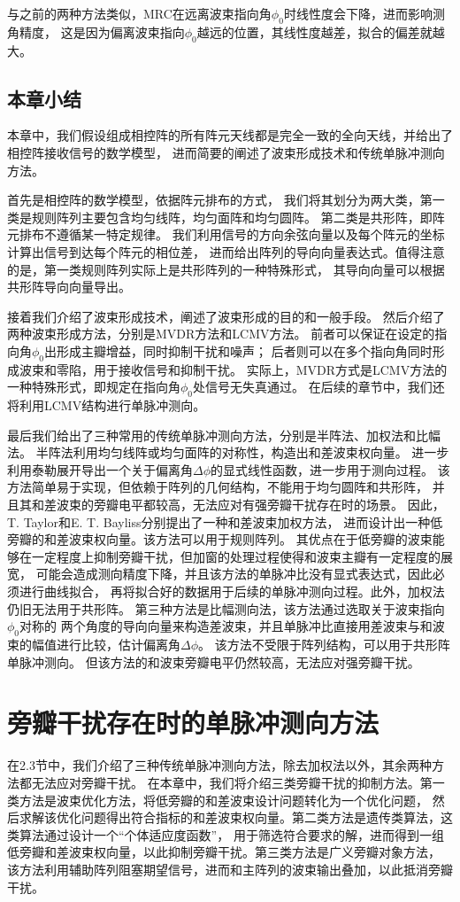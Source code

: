 \documentclass[master]{thesis-uestc}
\begin{document}
与之前的两种方法类似，MRC在远离波束指向角$\phi_0$时线性度会下降，进而影响测角精度，
这是因为偏离波束指向$\phi_0$越远的位置，其线性度越差，拟合的偏差就越大。

\section{本章小结}
本章中，我们假设组成相控阵的所有阵元天线都是完全一致的全向天线，并给出了相控阵接收信号的数学模型，
进而简要的阐述了波束形成技术和传统单脉冲测向方法。

首先是相控阵的数学模型，依据阵元排布的方式，
我们将其划分为两大类，第一类是规则阵列主要包含均匀线阵，均匀面阵和均匀圆阵。
第二类是共形阵，即阵元排布不遵循某一特定规律。
我们利用信号的方向余弦向量以及每个阵元的坐标计算出信号到达每个阵元的相位差，
进而给出阵列的导向向量表达式。值得注意的是，第一类规则阵列实际上是共形阵列的一种特殊形式，
其导向向量可以根据共形阵导向向量导出。

接着我们介绍了波束形成技术，阐述了波束形成的目的和一般手段。
然后介绍了两种波束形成方法，分别是MVDR方法和LCMV方法。
前者可以保证在设定的指向角$\phi_0$出形成主瓣增益，同时抑制干扰和噪声；
后者则可以在多个指向角同时形成波束和零陷，用于接收信号和抑制干扰。
实际上，MVDR方式是LCMV方法的一种特殊形式，即规定在指向角$\phi_0$处信号无失真通过。
在后续的章节中，我们还将利用LCMV结构进行单脉冲测向。

最后我们给出了三种常用的传统单脉冲测向方法，分别是半阵法、加权法和比幅法。
半阵法利用均匀线阵或均匀面阵的对称性，构造出和差波束权向量。
进一步利用泰勒展开导出一个关于偏离角$\Delta\phi$的显式线性函数，进一步用于测向过程。
该方法简单易于实现，但依赖于阵列的几何结构，不能用于均匀圆阵和共形阵，
并且其和差波束的旁瓣电平都较高，无法应对有强旁瓣干扰存在时的场景。
因此，T. Taylor和E. T. Bayliss分别提出了一种和差波束加权方法，
进而设计出一种低旁瓣的和差波束权向量。该方法可以用于规则阵列。
其优点在于低旁瓣的波束能够在一定程度上抑制旁瓣干扰，但加窗的处理过程使得和波束主瓣有一定程度的展宽，
可能会造成测向精度下降，并且该方法的单脉冲比没有显式表达式，因此必须进行曲线拟合，
再将拟合好的数据用于后续的单脉冲测向过程。此外，加权法仍旧无法用于共形阵。
第三种方法是比幅测向法，该方法通过选取关于波束指向$\phi_0$对称的
两个角度的导向向量来构造差波束，并且单脉冲比直接用差波束与和波束的幅值进行比较，估计偏离角$\Delta\phi$。
该方法不受限于阵列结构，可以用于共形阵单脉冲测向。
但该方法的和波束旁瓣电平仍然较高，无法应对强旁瓣干扰。

\chapter{旁瓣干扰存在时的单脉冲测向方法}
在2.3节中，我们介绍了三种传统单脉冲测向方法，除去加权法以外，其余两种方法都无法应对旁瓣干扰。
在本章中，我们将介绍三类旁瓣干扰的抑制方法。第一类方法是波束优化方法，将低旁瓣的和差波束设计问题转化为一个优化问题，
然后求解该优化问题得出符合指标的和差波束权向量。第二类方法是遗传类算法，这类算法通过设计一个“个体适应度函数”，
用于筛选符合要求的解，进而得到一组低旁瓣和差波束权向量，以此抑制旁瓣干扰。第三类方法是广义旁瓣对象方法，
该方法利用辅助阵列阻塞期望信号，进而和主阵列的波束输出叠加，以此抵消旁瓣干扰。
\end{document}
